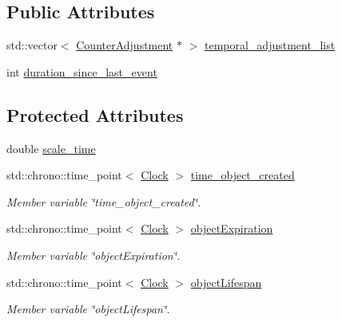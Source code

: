 \subsection*{Public Attributes}
\begin{DoxyCompactItemize}
\item 
std\+::vector$<$ \hyperlink{struct_dimension_1_1_counter_adjustment}{Counter\+Adjustment} $\ast$ $>$ \hyperlink{class_dimension_a370bb42cca1211c7a6c66846ecec4dd9}{temporal\+\_\+adjustment\+\_\+list}
\item 
int \hyperlink{class_dimension_a8095020214e474081002dbf7d9ff9d42}{duration\+\_\+since\+\_\+last\+\_\+event}
\end{DoxyCompactItemize}
\subsection*{Protected Attributes}
\begin{DoxyCompactItemize}
\item 
double \hyperlink{class_dimension_ad3ba9c1c332756658b1e711c447831a3}{scale\+\_\+time}
\item 
std\+::chrono\+::time\+\_\+point$<$ \hyperlink{universe_8h_a0ef8d951d1ca5ab3cfaf7ab4c7a6fd80}{Clock} $>$ \hyperlink{class_dimension_a99ba1a7fe44c7e52520144ab4793cad3}{time\+\_\+object\+\_\+created}
\begin{DoxyCompactList}\small\item\em Member variable \char`\"{}time\+\_\+object\+\_\+created\char`\"{}. \end{DoxyCompactList}\item 
std\+::chrono\+::time\+\_\+point$<$ \hyperlink{universe_8h_a0ef8d951d1ca5ab3cfaf7ab4c7a6fd80}{Clock} $>$ \hyperlink{class_dimension_ac2df45c101a97359cfe179636f62b0f2}{object\+Expiration}
\begin{DoxyCompactList}\small\item\em Member variable \char`\"{}object\+Expiration\char`\"{}. \end{DoxyCompactList}\item 
std\+::chrono\+::time\+\_\+point$<$ \hyperlink{universe_8h_a0ef8d951d1ca5ab3cfaf7ab4c7a6fd80}{Clock} $>$ \hyperlink{class_dimension_a249074ae65a06cb5386baf196bdee022}{object\+Lifespan}
\begin{DoxyCompactList}\small\item\em Member variable \char`\"{}object\+Lifespan\char`\"{}. \end{DoxyCompactList}\end{DoxyCompactItemize}
